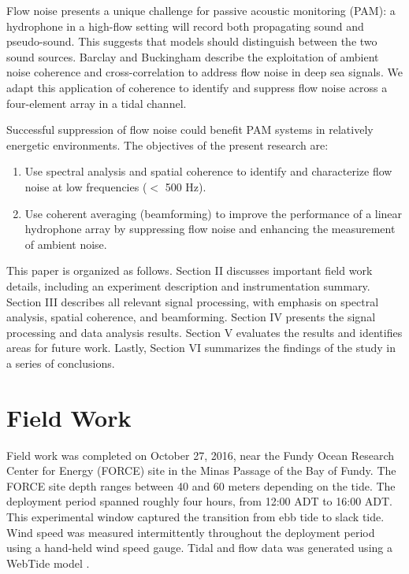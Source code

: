 \documentclass[12pt,journal,onecolumn]{IEEEtran}
\begin{document}
Flow noise presents a unique challenge for passive acoustic monitoring (PAM): a hydrophone in a high-flow setting will record both propagating sound and pseudo-sound. This suggests that models  should distinguish between the two sound sources. Barclay and Buckingham \cite{barclaywind} describe the exploitation of ambient noise coherence and cross-correlation to address flow noise in deep sea signals. We adapt this application of coherence to identify and suppress flow noise across a four-element array in a tidal channel.  %

Successful suppression of flow noise could benefit PAM systems in relatively energetic environments. %
The objectives of the present research are: 
\begin{enumerate}
\item Use spectral analysis and spatial coherence to identify and characterize flow noise at low frequencies ($<$ 500 Hz).
\item Use coherent averaging (beamforming) to improve the performance of a linear hydrophone array by suppressing flow noise and enhancing the measurement of ambient noise. 
\end{enumerate}

This paper is organized as follows. Section II discusses important field work details, including an experiment description and instrumentation summary. Section III describes all relevant signal processing, with emphasis on spectral analysis, spatial coherence, and beamforming. Section IV presents the signal processing and data analysis results. Section V evaluates the results and identifies areas for future work. Lastly, Section VI summarizes the findings of the study in a series of conclusions.
\section{Field Work}
\label{II}


Field work was completed on October 27, 2016, near the Fundy Ocean Research Center for Energy (FORCE) site in the Minas Passage of the Bay of Fundy. The FORCE site depth ranges between 40 and 60 meters depending on the tide. The deployment period spanned roughly four hours, from 12:00 ADT to 16:00 ADT. This experimental window captured the transition from ebb tide to slack tide. Wind speed was measured intermittently throughout the deployment period using a hand-held wind speed gauge. Tidal and flow data was generated using a WebTide model \cite{webtide}. 
\end{document}
